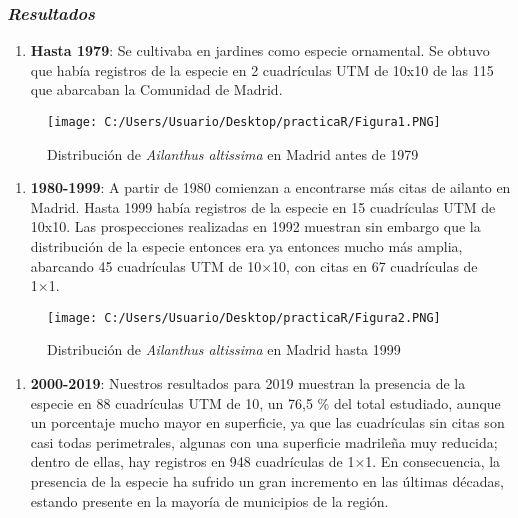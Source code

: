 \documentclass[
]{article}
\providecommand{\tightlist}{%
  \setlength{\itemsep}{0pt}\setlength{\parskip}{0pt}}
\begin{document}
\hypertarget{resultados}{%
\subsubsection{\texorpdfstring{\emph{Resultados}}{Resultados}}\label{resultados}}

\begin{enumerate}
\def\labelenumi{\alph{enumi})}
\tightlist
\item
  \textbf{Hasta 1979}: Se cultivaba en jardines como especie ornamental.
  Se obtuvo que había registros de la especie en 2 cuadrículas UTM de
  10x10 de las 115 que abarcaban la Comunidad de Madrid.
\end{enumerate}

\begin{figure}
\centering
\texttt{[image: C:/Users/Usuario/Desktop/practicaR/Figura1.PNG]}
\caption{Distribución de \emph{Ailanthus altissima} en Madrid antes de
1979}
\end{figure}

\begin{enumerate}
\def\labelenumi{\alph{enumi})}
\setcounter{enumi}{1}
\tightlist
\item
  \textbf{1980-1999}: A partir de 1980 comienzan a encontrarse más citas
  de ailanto en Madrid. Hasta 1999 había registros de la especie en 15
  cuadrículas UTM de 10x10. Las prospecciones realizadas en 1992
  muestran sin embargo que la distribución de la especie entonces era ya
  entonces mucho más amplia, abarcando 45 cuadrículas UTM de 10×10, con
  citas en 67 cuadrículas de 1×1.
\end{enumerate}

\begin{figure}
\centering
\texttt{[image: C:/Users/Usuario/Desktop/practicaR/Figura2.PNG]}
\caption{Distribución de \emph{Ailanthus altissima} en Madrid hasta
1999}
\end{figure}

\begin{enumerate}
\def\labelenumi{\alph{enumi})}
\setcounter{enumi}{2}
\tightlist
\item
  \textbf{2000-2019}: Nuestros resultados para 2019 muestran la
  presencia de la especie en 88 cuadrículas UTM de 10, un 76,5 \% del
  total estudiado, aunque un porcentaje mucho mayor en superficie, ya
  que las cuadrículas sin citas son casi todas perimetrales, algunas con
  una superficie madrileña muy reducida; dentro de ellas, hay registros
  en 948 cuadrículas de 1×1. En consecuencia, la presencia de la especie
  ha sufrido un gran incremento en las últimas décadas, estando presente
  en la mayoría de municipios de la región.
\end{enumerate}
\end{document}
